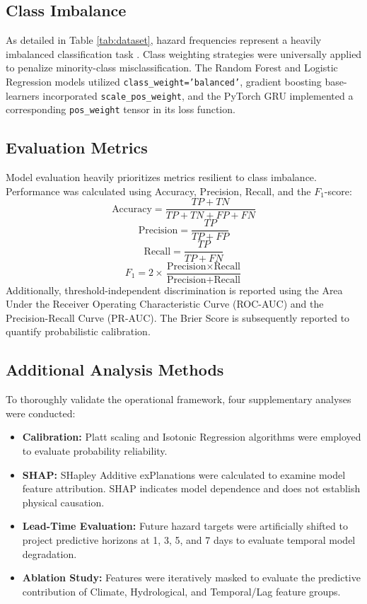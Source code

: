 \subsection{Class Imbalance}
As detailed in Table \ref{tab:dataset}, hazard frequencies represent a heavily imbalanced classification task \cite{He2009}. Class weighting strategies were universally applied to penalize minority-class misclassification. The Random Forest and Logistic Regression models utilized \texttt{class\_weight='balanced'}, gradient boosting base-learners incorporated \texttt{scale\_pos\_weight}, and the PyTorch GRU implemented a corresponding \texttt{pos\_weight} tensor in its loss function.

\subsection{Evaluation Metrics}
Model evaluation heavily prioritizes metrics resilient to class imbalance. Performance was calculated using Accuracy, Precision, Recall, and the $F_1$-score:
\begin{equation}
    \text{Accuracy} = \frac{TP + TN}{TP + TN + FP + FN}
\end{equation}
\begin{equation}
    \text{Precision} = \frac{TP}{TP + FP}
\end{equation}
\begin{equation}
    \text{Recall} = \frac{TP}{TP + FN}
\end{equation}
\begin{equation}
    F_1 = 2 \times \frac{\text{Precision} \times \text{Recall}}{\text{Precision} + \text{Recall}}
\end{equation}
Additionally, threshold-independent discrimination is reported using the Area Under the Receiver Operating Characteristic Curve (ROC-AUC) and the Precision-Recall Curve (PR-AUC). The Brier Score is subsequently reported to quantify probabilistic calibration.

\subsection{Additional Analysis Methods}
To thoroughly validate the operational framework, four supplementary analyses were conducted:
\begin{itemize}
    \item \textbf{Calibration:} Platt scaling \cite{Platt1999} and Isotonic Regression \cite{Zadrozny2002} algorithms were employed to evaluate probability reliability.
    \item \textbf{SHAP:} SHapley Additive exPlanations \cite{Lundberg2017} were calculated to examine model feature attribution. SHAP indicates model dependence and does not establish physical causation.
    \item \textbf{Lead-Time Evaluation:} Future hazard targets were artificially shifted to project predictive horizons at 1, 3, 5, and 7 days to evaluate temporal model degradation.
    \item \textbf{Ablation Study:} Features were iteratively masked to evaluate the predictive contribution of Climate, Hydrological, and Temporal/Lag feature groups.
\end{itemize}
